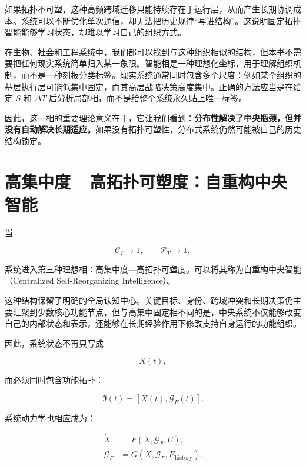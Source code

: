 如果拓扑不可塑，这种高频跨域迁移只能持续存在于运行层，从而产生长期协调成本。系统可以不断优化单次通信，却无法把历史规律“写进结构”。这说明固定拓扑智能能够学习状态，却难以学习自己的组织方式。

在生物、社会和工程系统中，我们都可以找到与这种组织相似的结构，但本书不需要把任何现实系统简单归入某一象限。智能相是一种理想化坐标，用于理解组织机制，而不是一种刻板分类标签。现实系统通常同时包含多个尺度：例如某个组织的基层执行层可能低集中固定，而其高层战略决策高度集中。正确的方法应当是在给定 $S$ 和 $\Delta T$ 后分析局部相，而不是给整个系统永久贴上唯一标签。

因此，这一相的重要理论意义在于，它让我们看到：\textbf{分布性解决了中央瓶颈，但并没有自动解决长期适应。}如果没有拓扑可塑性，分布式系统仍然可能被自己的历史结构锁定。

\section{高集中度—高拓扑可塑度：自重构中央智能}
\label{sec:centralized_plastic_phase}

当

\begin{equation}
\mathcal{C}_{I}\rightarrow1,
\qquad
\mathcal{P}_{T}\rightarrow1,
\end{equation}

系统进入第三种理想相：高集中度—高拓扑可塑度。可以将其称为自重构中央智能（Centralized Self-Reorganizing Intelligence）。

这种结构保留了明确的全局认知中心。关键目标、身份、跨域冲突和长期决策仍主要汇聚到少数核心功能节点，但与高集中固定相不同的是，中央系统不仅能够改变自己的内部状态和表示，还能够在长期经验作用下修改支持自身运行的功能组织。

因此，系统状态不再只写成

\begin{equation}
X(t),
\end{equation}

而必须同时包含功能拓扑：

\begin{equation}
\mathfrak{I}(t)
=
\left[
X(t),
\mathcal{G}_F(t)
\right].
\end{equation}

系统动力学也相应成为：

\begin{align}
\dot{X}
&=
F
\left(
X,
\mathcal{G}_F,
U
\right),
\\
\dot{\mathcal{G}}_F
&=
G
\left(
X,
\mathcal{G}_F,
E_{\mathrm{history}}
\right).
\end{align}

